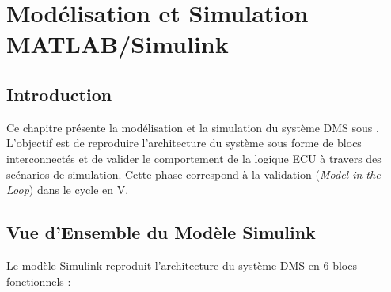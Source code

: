 
\chapter{Modélisation et Simulation MATLAB/Simulink}

\section{Introduction}

Ce chapitre présente la modélisation et la simulation du système DMS sous . L'objectif est de reproduire l'architecture du système sous forme de blocs interconnectés et de valider le comportement de la logique ECU à travers des scénarios de simulation. Cette phase correspond à la validation  (\textit{Model-in-the-Loop}) dans le cycle en V.

\section{Vue d'Ensemble du Modèle Simulink}

Le modèle Simulink reproduit l'architecture du système DMS en 6 blocs fonctionnels :

